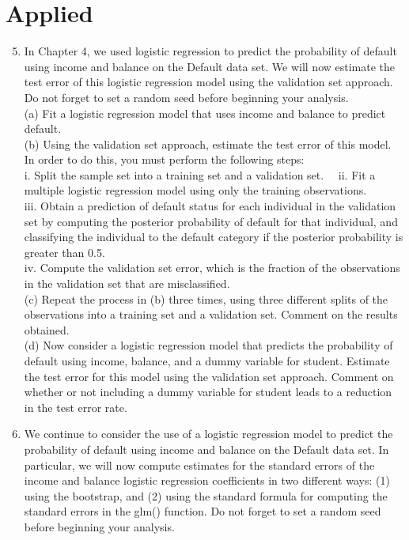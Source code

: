 \documentclass[10pt]{article}
\begin{document}
\section*{Applied}
\begin{enumerate}
  \setcounter{enumi}{4}
  \item In Chapter 4, we used logistic regression to predict the probability of default using income and balance on the Default data set. We will now estimate the test error of this logistic regression model using the validation set approach. Do not forget to set a random seed before beginning your analysis.\\
(a) Fit a logistic regression model that uses income and balance to predict default.\\
(b) Using the validation set approach, estimate the test error of this model. In order to do this, you must perform the following steps:\\
i. Split the sample set into a training set and a validation set.\
\
ii. Fit a multiple logistic regression model using only the training observations.\\
iii. Obtain a prediction of default status for each individual in the validation set by computing the posterior probability of default for that individual, and classifying the individual to the default category if the posterior probability is greater than 0.5.\\
iv. Compute the validation set error, which is the fraction of the observations in the validation set that are misclassified.\\
(c) Repeat the process in (b) three times, using three different splits of the observations into a training set and a validation set. Comment on the results obtained.\\
(d) Now consider a logistic regression model that predicts the probability of default using income, balance, and a dummy variable for student. Estimate the test error for this model using the validation set approach. Comment on whether or not including a dummy variable for student leads to a reduction in the test error rate.
  \item We continue to consider the use of a logistic regression model to predict the probability of default using income and balance on the Default data set. In particular, we will now compute estimates for the standard errors of the income and balance logistic regression coefficients in two different ways: (1) using the bootstrap, and (2) using the standard formula for computing the standard errors in the glm() function. Do not forget to set a random seed before beginning your analysis.\\

\end{enumerate}
\end{document}
